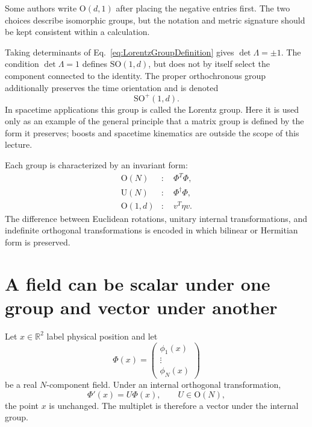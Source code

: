 \documentclass[11pt]{article}
\newcommand{\R}{\mathbb{R}}
\newcommand{\SO}{\mathrm{SO}}
\newcommand{\OO}{\mathrm{O}}
\newcommand{\UU}{\mathrm{U}}
\begin{document}
Some authors write \(\OO(d,1)\) after placing the negative entries first.
The two choices describe isomorphic groups, but the notation and metric
signature should be kept consistent within a calculation.

Taking determinants of Eq.~\eqref{eq:LorentzGroupDefinition} gives
\(\det\Lambda=\pm1\).  The condition \(\det\Lambda=1\) defines
\(\SO(1,d)\), but does not by itself select the component connected to the
identity.  The proper orthochronous group additionally preserves the time
orientation and is denoted
\begin{equation}
  \SO^+(1,d).
  \label{eq:properOrthochronous}
\end{equation}
In spacetime applications this group is called the Lorentz group.  Here it is
used only as an example of the general principle that a matrix group is
defined by the form it preserves; boosts and spacetime kinematics are outside
the scope of this lecture.

\begin{remarkbox}
Each group is characterized by an invariant form:
\begin{align*}
  \OO(N)&:\quad \Phi^T\Phi,\\
  \UU(N)&:\quad \Phi^\dagger\Phi,\\
  \OO(1,d)&:\quad v^T\eta v.
\end{align*}
The difference between Euclidean rotations, unitary internal transformations,
and indefinite orthogonal transformations is encoded in which bilinear or
Hermitian form is preserved.
\end{remarkbox}

\section{A field can be scalar under one group and vector under another}

Let \(x\in\R^2\) label physical position and let
\begin{equation}
  \Phi(x)=
  \begin{pmatrix}
    \phi_1(x)\\[-2pt]
    \vdots\\[-2pt]
    \phi_N(x)
  \end{pmatrix}
  \label{eq:internalMultiplet}
\end{equation}
be a real \(N\)-component field.  Under an internal orthogonal
transformation,
\begin{equation}
  \Phi'(x)=U\Phi(x),
  \qquad
  U\in\OO(N),
  \label{eq:internalVectorTransformation}
\end{equation}
the point \(x\) is unchanged.  The multiplet is therefore a vector under the
internal group.
\end{document}
